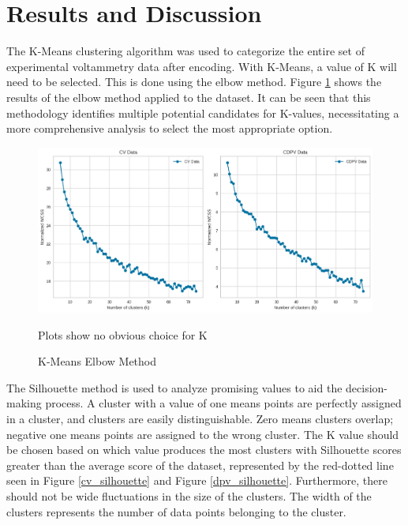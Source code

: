 \section{Results and Discussion}
The K-Means clustering algorithm was used to categorize the entire set of experimental voltammetry data after encoding. With K-Means, a value of K will need to be selected. This is done using the elbow method. Figure \ref{elbow} shows the results of the elbow method applied to the dataset. It can be seen that this methodology identifies multiple potential candidates for K-values, necessitating a more comprehensive analysis to select the most appropriate option. 
\begin{figure}[!h]
  \centering
    \includegraphics[width=1.0\textwidth]{figures/elbowmethod.png}
    \caption{K-Means Elbow Method}
    \label{elbow}
    Plots show no obvious choice for K
\end{figure}
The Silhouette method is used to analyze promising values to aid the decision-making process. A cluster with a value of one means points are perfectly assigned in a cluster, and clusters are easily distinguishable. Zero means clusters overlap; negative one means points are assigned to the wrong cluster. The K value should be chosen based on which value produces the most clusters with Silhouette scores greater than the average score of the dataset, represented by the red-dotted line seen in Figure \ref{cv_silhouette} and Figure \ref{dpv_silhouette}. Furthermore, there should not be wide fluctuations in the size of the clusters. The width of the clusters represents the number of data points belonging to the cluster. 
